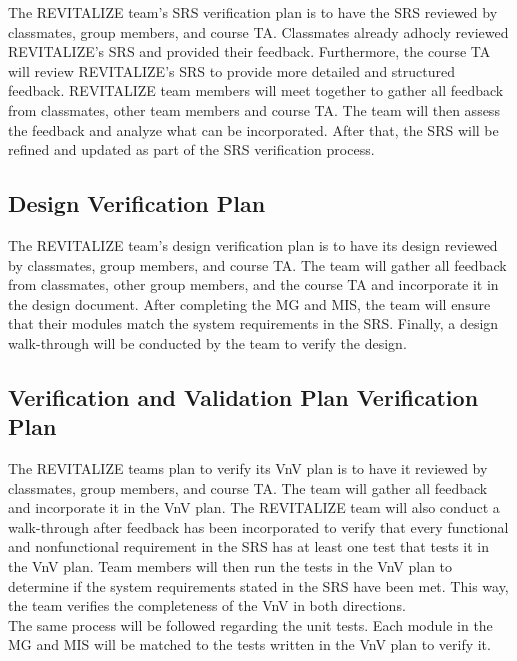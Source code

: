 \documentclass[12pt, titlepage]{article}
\begin{document}


The REVITALIZE team's SRS verification plan is to have the SRS reviewed by classmates, group members, and course TA. Classmates already adhocly reviewed REVITALIZE's SRS and provided their feedback. Furthermore, the course TA will review REVITALIZE's SRS to provide more detailed and structured feedback. REVITALIZE team members will meet together to gather all feedback from classmates, other team members and course TA. The team will then assess the feedback and analyze what can be incorporated. After that, the SRS will be refined and updated as part of the SRS verification process.

\subsection{Design Verification Plan}




The REVITALIZE team's design verification plan is to have its design reviewed by classmates, group members, and course TA. The team will gather all feedback from classmates, other group members, and the course TA and incorporate it in the design document. After completing the MG and MIS, the team will ensure that their modules match the system requirements in the SRS. Finally, a design walk-through will be conducted by the team to verify the design.

\subsection{Verification and Validation Plan Verification Plan}




The REVITALIZE teams plan to verify its VnV plan is to have it reviewed by classmates, group members, and course TA. The team will gather all feedback and incorporate it in the VnV plan. The REVITALIZE team will also conduct a walk-through after feedback has been incorporated to verify that every functional and nonfunctional requirement in the SRS has at least one test that tests it in the VnV plan. Team members will then run the tests in the VnV plan to determine if the system requirements stated in the SRS have been met. This way, the team verifies the completeness of the VnV in both directions.\\
The same process will be followed regarding the unit tests. Each module in the MG and MIS will be matched to the tests written in the VnV plan to verify it.
\end{document}
